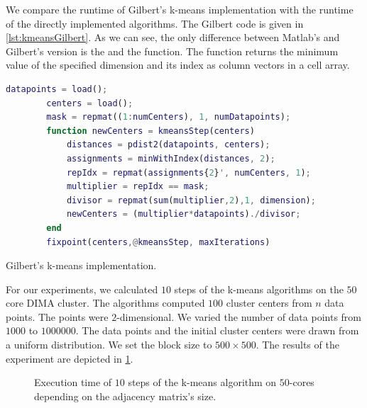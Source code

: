 We compare the runtime of Gilbert's k-means implementation with the runtime of the directly implemented algorithms.
The Gilbert code is given in \cref{lst:kmeansGilbert}.
As we can see, the only difference between Matlab's and Gilbert's version is the  and the  function.
The  function returns the minimum value of the specified dimension and its index as column vectors in a cell array.

\begin{listing}[!h]
	\begin{CenteredBox}
		\begin{lstlisting}[language=Matlab]
		datapoints = load();
		centers = load();
		mask = repmat((1:numCenters), 1, numDatapoints);
		function newCenters = kmeansStep(centers)
  			distances = pdist2(datapoints, centers);
		  	assignments = minWithIndex(distances, 2);
		  	repIdx = repmat(assignments{2}', numCenters, 1);
		  	multiplier = repIdx == mask;
		  	divisor = repmat(sum(multiplier,2),1, dimension);
		  	newCenters = (multiplier*datapoints)./divisor;
		end
		fixpoint(centers,@kmeansStep, maxIterations)
		\end{lstlisting}
	\end{CenteredBox}
	\caption{Gilbert's k-means implementation.}
	\label{lst:kmeansGilbert}
\end{listing}

For our experiments, we calculated $10$ steps of the k-means algorithms on the $50$ core DIMA cluster.
The algorithms computed $100$ cluster centers from $n$ data points.
The points were $2$-dimensional.
We varied the number of data points from $1000$ to $1000000$.
The data points and the initial cluster centers were drawn from a uniform distribution.
We set the block size to $500\times 500$.
The results of the experiment are depicted in \cref{fig:kmeansResult}.

\begin{figure}[h!]
	\centering
	\caption{Execution time of $10$ steps of the k-means algorithm on $50$-cores depending on the adjacency matrix's size.}
	\label{fig:kmeansResult}
\end{figure}

